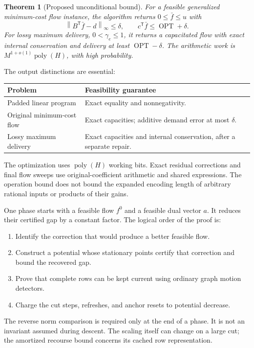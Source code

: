 \documentclass[11pt]{article}
\newtheorem{theorem}{Theorem}[section]
\theoremstyle{definition}\newtheorem{definition}[theorem]{Definition}
\theoremstyle{remark}\newtheorem{remark}[theorem]{Remark}
\newcommand{\norm}[1]{\left\lVert#1\right\rVert}
\newcommand{\poly}{\operatorname{poly}}
\DeclareMathOperator{\OPT}{OPT}
\begin{document}
\begin{theorem}[Proposed unconditional bound]\label{thm:main}
For a feasible generalized minimum-cost flow instance, the algorithm
returns $0\le\bar f\le u$ with
\[
 \norm{B^{\mathsf T}\bar f-d}_\infty\le\delta,
 \qquad c^{\mathsf T}\bar f\le\OPT+\delta.
\]
For lossy maximum delivery, $0<\gamma_e\le1$, it returns a capacitated
flow with exact internal conservation and delivery at least
$\OPT-\delta$. The arithmetic work is
$M^{1+o(1)}\poly(H)$, with high probability.
\end{theorem}

The output distinctions are essential:
\begin{center}
\begin{tabular}{p{.29\linewidth}p{.61\linewidth}}
\toprule
Problem & Feasibility guarantee\\\midrule
Padded linear program & Exact equality and nonnegativity.\\
Original minimum-cost flow & Exact capacities; additive demand error at most $\delta$.\\
Lossy maximum delivery & Exact capacities and internal conservation, after a separate repair.\\
\bottomrule
\end{tabular}
\end{center}
The optimization uses $\poly(H)$ working bits. Exact residual corrections
and final flow sweeps use original-coefficient arithmetic and shared
expressions. The operation bound does not bound the expanded encoding
length of arbitrary rational inputs or products of their gains.

One phase starts with a feasible flow $f^0$ and a feasible dual vector
$a$. It reduces their certified gap by a constant factor. The logical
order of the proof is:
\begin{enumerate}
\item Identify the correction that would produce a better feasible flow.
\item Construct a potential whose stationary points certify that correction
and bound the recovered gap.
\item Prove that complete rows can be kept current using ordinary graph
motion detectors.
\item Charge the cut steps, refreshes, and anchor resets to potential decrease.
\end{enumerate}
The reverse norm comparison is required only at the end of a phase.
It is not an invariant assumed during descent. The scaling itself can
change on a large cut; the amortized recourse bound concerns its cached
row representation.
\end{document}
